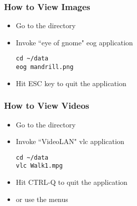 \begin{frame}[fragile]
\frametitle{How to View Images}
\begin{itemize}
\item Go to the directory
\item Invoke ``eye of gnome" eog application
\begin{verbatim}
cd ~/data
eog mandrill.png
\end{verbatim}
\pause
\item Hit ESC key to quit the application
\end{itemize}
\end{frame}

\begin{frame}[fragile]
\frametitle{How to View Videos}
\begin{itemize}
\item Go to the directory
\item Invoke ``VideoLAN" vlc application
\begin{verbatim}
cd ~/data
vlc Walk1.mpg
\end{verbatim}
\pause
\item Hit CTRL-Q to quit the application
\item or use the menus
\end{itemize}
\end{frame}
